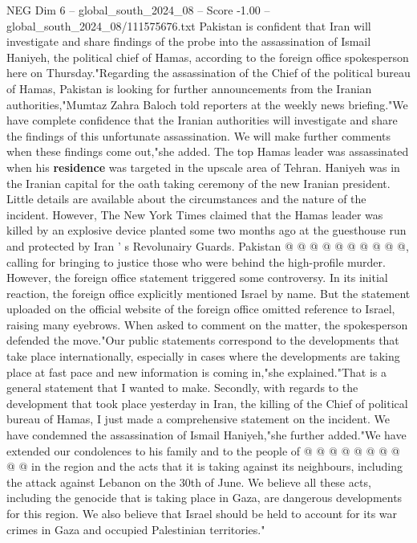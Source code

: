 \begin{textsample}{NEG Dim 6 – global\_south\_2024\_08 – Score -1.00 – global\_south\_2024\_08/111575676.txt}  \label{ex:f6_neg_128}
Pakistan is confident that Iran will investigate and share findings of the probe into the assassination of Ismail Haniyeh, the political chief of Hamas, according to the foreign office spokesperson here on Thursday."Regarding the assassination of the Chief of the political bureau of Hamas, Pakistan is looking for further announcements from the Iranian authorities,"Mumtaz Zahra Baloch told reporters at the weekly news briefing."We have complete confidence that the Iranian authorities will investigate and share the findings of this unfortunate assassination.
We will make further comments when these findings come out,"she added.
The top Hamas leader was assassinated when his \textbf{residence} was targeted in the upscale area of Tehran.
Haniyeh was in the Iranian capital for the oath taking ceremony of the new Iranian president.
Little details are available about the circumstances and the nature of the incident.
However, The New York Times claimed that the Hamas leader was killed by an explosive device planted some two months ago at the guesthouse run and protected by Iran ' s Revolunairy Guards.
Pakistan @ @ @ @ @ @ @ @ @ @, calling for bringing to justice those who were behind the high-profile murder.
However, the foreign office statement triggered some controversy.
In its initial reaction, the foreign office explicitly mentioned Israel by name.
But the statement uploaded on the official website of the foreign office omitted reference to Israel, raising many eyebrows.
When asked to comment on the matter, the spokesperson defended the move."Our public statements correspond to the developments that take place internationally, especially in cases where the developments are taking place at fast pace and new information is coming in,"she explained."That is a general statement that I wanted to make.
Secondly, with regards to the development that took place yesterday in Iran, the killing of the Chief of political bureau of Hamas, I just made a comprehensive statement on the incident.
We have condemned the assassination of Ismail Haniyeh,"she further added."We have extended our condolences to his family and to the people of @ @ @ @ @ @ @ @ @ @ in the region and the acts that it is taking against its neighbours, including the attack against Lebanon on the 30th of June.
We believe all these acts, including the genocide that is taking place in Gaza, are dangerous developments for this region.
We also believe that Israel should be held to account for its war crimes in Gaza and occupied Palestinian territories."

\end{textsample}
